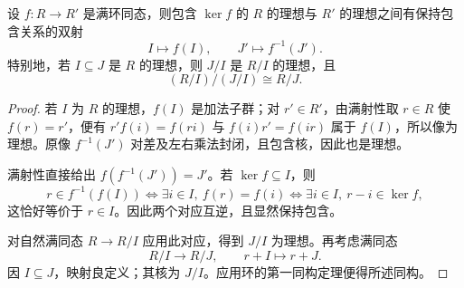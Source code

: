 \documentclass[lang=cn,a4paper,fontset=none,zihao=false,10pt,openany,twoside]{beautybook}
\numberwithin{algorithm}{chapter}
\begin{document}
\begin{theorem}[理想的对应与再次取商]\label{thm:ideal-correspondence}
设 $f:R\to R'$ 是满环同态，则包含 $\ker f$ 的 $R$ 的理想与 $R'$ 的理想之间有保持包含关系的双射
\[
 I\longmapsto f(I),\qquad J'\longmapsto f^{-1}(J').
\]
特别地，若 $I\subseteq J$ 是 $R$ 的理想，则 $J/I$ 是 $R/I$ 的理想，且
\[
 (R/I)/(J/I)\cong R/J.
\]
\end{theorem}
\begin{proof}
若 $I$ 为 $R$ 的理想，$f(I)$ 是加法子群；对 $r'\in R'$，由满射性取 $r\in R$ 使 $f(r)=r'$，便有 $r'f(i)=f(ri)$ 与 $f(i)r'=f(ir)$ 属于 $f(I)$，所以像为理想。原像 $f^{-1}(J')$ 对差及左右乘法封闭，且包含核，因此也是理想。

满射性直接给出 $f(f^{-1}(J'))=J'$。若 $\ker f\subseteq I$，则
\[
 r\in f^{-1}(f(I))\Longleftrightarrow
 \exists i\in I,\ f(r)=f(i)
 \Longleftrightarrow\exists i\in I,\ r-i\in\ker f,
\]
这恰好等价于 $r\in I$。因此两个对应互逆，且显然保持包含。

对自然满同态 $R\to R/I$ 应用此对应，得到 $J/I$ 为理想。再考虑满同态
\[
 R/I\longrightarrow R/J,\qquad r+I\longmapsto r+J.
\]
因 $I\subseteq J$，映射良定义；其核为 $J/I$。应用环的第一同构定理便得所述同构。
\end{proof}
\end{document}
